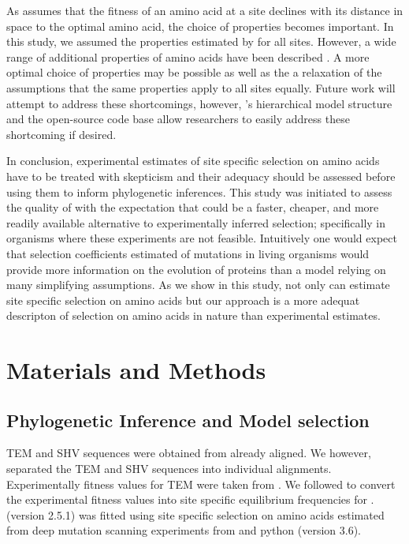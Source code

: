 \documentclass[12pt]{article}
\begin{document}

As \selac assumes that the fitness of an amino acid at a site declines with its distance in \PC space to the optimal amino acid, the choice of \PC properties becomes important.
In this study, we assumed the \PC properties estimated by \citet{grantham1974} for all sites.
However, a wide range of additional \PC properties of amino acids have been described \citep{Kawashima2008}.
A more optimal choice of \PC properties may be possible as well as the a relaxation of the assumptions that the same properties apply to all sites equally.
Future work will attempt to address these shortcomings, however, \selac's hierarchical model structure and the open-source code base allow researchers to easily address these shortcoming if desired.

In conclusion, experimental estimates of site specific selection on amino acids have to be treated with skepticism and their adequacy should be assessed before using them to inform phylogenetic inferences.
This study was initiated to assess the quality of \selac with the expectation that \selac could be a faster, cheaper, and more readily available alternative to experimentally inferred selection;
specifically in organisms where these experiments are not feasible.
Intuitively one would expect that selection coefficients estimated of mutations in living organisms would provide more information on the evolution of proteins than a model relying on many simplifying assumptions.
As we show in this study, not only can \selac estimate site specific selection on amino acids but our approach is a more adequat descripton of selection on amino acids in nature than experimental estimates.


\section*{Materials and Methods}

\subsection*{Phylogenetic Inference and Model selection}

TEM and SHV sequences were obtained from \citet{bloom2017} already aligned.
We however, separated the TEM and SHV sequences into individual alignments.
Experimentally fitness values for TEM were taken from \citet{stiffler2016}.
We followed \citep{bloom2017} to convert the experimental fitness values into site specific equilibrium frequencies for \phydms. 
\phydms (version 2.5.1) was fitted using site specific selection on amino acids estimated from deep mutation scanning experiments from \citet{stiffler2016} and python (version 3.6).
\end{document}
